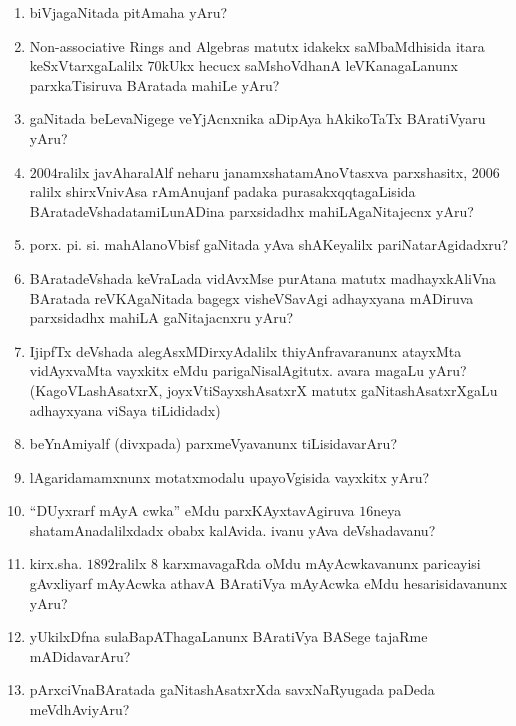 \begin{enumerate}
\item biVjagaNitada pitAmaha yAru?
  
\item {\rm Non-associative Rings and Algebras} matutx idakekx saMbaMdhisida itara keSxVtarxgaLalilx $70$kUkx hecucx saMshoVdhanA leVKanagaLanunx  parxkaTisiruva BAratada mahiLe yAru?
  
\item gaNitada beLevaNigege veYjAcnxnika aDipAya hAkikoTaTx BAratiVyaru yAru?
  
\item $2004$ralilx javAharalAlf neharu janamxshatamAnoVtasxva parxshasitx, $2006$ralilx shirxVnivAsa rAmAnujanf padaka purasakxqqtagaLisida BAratadeVshada\break tamiLunADina parxsidadhx mahiLAgaNitajecnx yAru?

\item porx. pi. si. mahAlanoVbisf gaNitada yAva shAKeyalilx pariNatarAgi\-dadxru?
  
\item BAratadeVshada keVraLada vidAvxMse purAtana matutx madhayxkAliVna BAratada reVKAgaNitada bagegx visheVSavAgi adhayxyana mADiruva parxsidadhx mahiLA gaNitajacnxru yAru?
  
\item IjipfTx deVshada alegAsxMDirxyAdalilx thiyAnfravaranunx atayxMta vidAyxvaMta vayxkitx eMdu parigaNisalAgitutx. avara magaLu yAru? (KagoVLashAsatxrX, joyxVtiSayxshAsatxrX matutx gaNitashAsatxrXgaLu adhayxyana viSaya tiLididadx)
  
\item beYnAmiyalf (divxpada) parxmeVyavanunx tiLisidavarAru?
  
\item lAgaridamamxnunx motatxmodalu upayoVgisida vayxkitx yAru?
  
\item ``DUyxrarf mAyA cwka'' eMdu parxKAyxtavAgiruva $16$neya shatamAna\-dalilxdadx obabx kalAvida. ivanu yAva deVshadavanu?
  
\item kirx.sha. $1892$ralilx $8$ karxmavagaRda oMdu mAyAcwkavanunx paricayisi gAvxliyarf mAyAcwka athavA BAratiVya mAyAcwka eMdu hesarisidavanunx yAru?
 
\item yUkilxDfna sulaBapAThagaLanunx BAratiVya BASege tajaRme mADi\-davarAru?

\item pArxciVnaBAratada gaNitashAsatxrXda savxNaRyugada paDeda meVdhAviyAru?
  

\end{enumerate}
